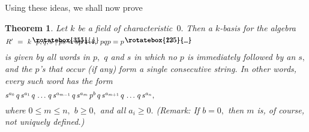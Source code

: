 \documentclass{amsart}
\newtheorem{theorem}{Theorem}
\DeclareRobustCommand{\lang}{\begin{picture}(5,7)
\put(1.2,2.5){\rotatebox{45}{\line(1,0){6.0}}}
\put(1.2,2.5){\rotatebox{315}{\line(1,0){6.0}}}
\end{picture}\kern.16em}
\DeclareRobustCommand{\rang}{\kern.1em\begin{picture}(5,7)
\put(.1,2.5){\rotatebox{135}{\line(1,0){6.0}}}
\put(.1,2.5){\rotatebox{225}{\line(1,0){6.0}}}
\end{picture}}
\begin{document}
Using these ideas, we shall now prove

\begin{theorem}\label{T.W}
Let $k$ be a field of characteristic~$0.$
Then a $\!k\!$-basis for the algebra
\begin{equation}\begin{minipage}[c]{35pc}\label{d.W:R'=.}
$R'\ =\ k\lang p,q,s\mid ps=sp+1,\ pqp=p\rang$
\end{minipage}\end{equation}
is given by all words in $p,$ $q$ and $s$ in which no $p$
is immediately followed by an $s,$ and the $\!p\!$'s that
occur \textup{(}if any\textup{)} form a single consecutive string.
In other words, every such word has the form
\begin{equation}\begin{minipage}[c]{35pc}\label{d.W:n_form}
$s^{a_0}\,q\,s^{a_1}\,q\,\dots\,q\,s^{a_{m-1}}\,q\,s^{a_m}\,p^b\,q\,
s^{a_{m+1}}\,q\,\dots\,q\,s^{a_n},$
\end{minipage}\end{equation}
where $0\leq m\leq n,$ $b\geq 0,$ and all $a_i\geq 0.$
\textup{(}Remark: If $b=0,$ then $m$ is,
of course, not uniquely defined.\textup{)}
\end{theorem}
\end{document}
